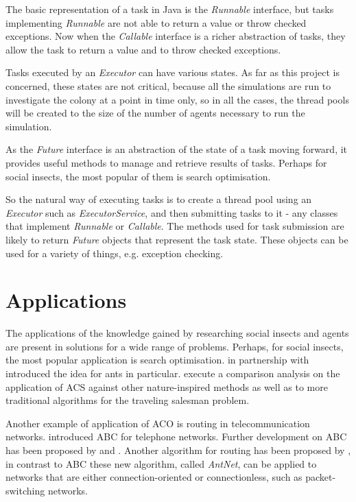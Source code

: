 The basic representation of a task in Java is the \emph{Runnable} interface, but tasks implementing \emph{Runnable} are not able to return a value or throw checked exceptions.\cite{goetz2006java} Now when the \emph{Callable} interface is a richer abstraction of tasks, they allow the task to return a value and to throw checked exceptions. 

Tasks executed by an \emph{Executor} can have various states. As far as this project is concerned, these states are not critical, because all the simulations are run to investigate the colony at a point in time only, so in all the cases, the thread pools will be created to the size of the number of agents necessary to run the simulation.

As the \emph{Future} interface is an abstraction of the state of a task moving forward, it provides useful methods to manage and retrieve results of tasks. Perhaps for social insects, the most popular of them is search optimisation.

So the natural way of executing tasks is to create a thread pool using an \emph{Executor} such as \emph{ExecutorService}, and then submitting tasks to it - any classes that implement \emph{Runnable} or \emph{Callable}. The methods used for task submission are likely to return \emph{Future} objects that represent the task state. These objects can be used for a variety of things, e.g. exception checking.

\section{Applications}

The applications of the knowledge gained by researching social insects and agents are present in solutions for a wide range of problems. Perhaps, for social insects, the most popular application is search optimisation. \citeauthor{dorigo-phd} \cite{dorigo-phd} in partnership with \citeauthor{citeulike:5791708} \cite{citeulike:5791708, citeulike:7034555, citeulike:832379} introduced the idea for ants in particular. \citeauthor{Dorigo97antcolony} \cite{Dorigo97antcolonies, Dorigo97antcolony} execute a comparison analysis on the application of \ac{ACS} against other nature-inspired methods as well as to more traditional algorithms for the traveling salesman problem. 

Another example of application of \ac{ACO} is routing in telecommunication networks. \citeauthor{Schoonderwoerd96ant-basedload} \cite{Schoonderwoerd96ant-basedload} introduced \ac{ABC} for telephone networks. Further development on \ac{ABC} has been proposed by \citeauthor{Heusse98adaptiveagent-driven} \cite{Heusse98adaptiveagent-driven} and \citeauthor{Subramanian98antsand} \cite{Subramanian98antsand}. Another algorithm for routing has been proposed by \citeauthor{Caro98antnet:distributed} \cite{Caro98antnet:distributed, Caro97antnet:a, DiCaro:1998:ADS:1622797.1622806}, in contrast to  \ac{ABC} these new algorithm, called \emph{AntNet}, can be applied to networks that are either connection-oriented or connectionless, such as packet-switching networks.

